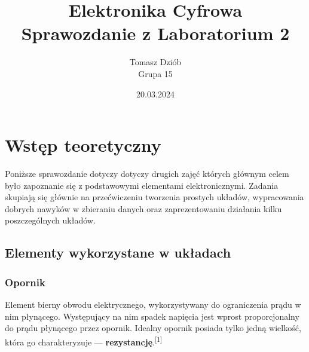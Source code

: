 \documentclass{article}
\begin{document}
  \pagestyle{fancy} %
  \fancyhf{} %
  \fancyfoot[C]{\thepage}
  \renewcommand{\headrulewidth}{0pt} %
  \renewcommand{\footrulewidth}{0.4pt} %
  \addtolength{\footskip}{0cm} %

  \title{Elektronika Cyfrowa \\ {\large Sprawozdanie z Laboratorium 2}}
  \date{20.03.2024}
  \author{Tomasz Dziób\\{\small Grupa 15}}
  \maketitle

  \setcounter{tocdepth}{4} %
  \setcounter{secnumdepth}{4} %
  \tableofcontents
  \pagebreak
  
  \section{Wstęp teoretyczny}
    Poniższe sprawozdanie dotyczy dotyczy drugich zajęć których głównym celem było zapoznanie się z podstawowymi elementami elektronicznymi. Zadania skupiają się głównie na przećwiczeniu tworzenia prostych układów, wypracowania dobrych nawyków w zbieraniu danych oraz zaprezentowaniu działania kilku poszczególnych układów.

    \subsection{Elementy wykorzystane w układach}

      \subsubsection{Opornik}
        Element bierny obwodu elektrycznego, wykorzystywany do ograniczenia prądu w nim płynącego. Występujący na nim spadek napięcia jest wprost proporcjonalny do prądu płynącego przez opornik. Idealny opornik posiada tylko jedną wielkość, która go charakteryzuje --- \textbf{rezystancję}.\textsuperscript{[1]}
\end{document}
